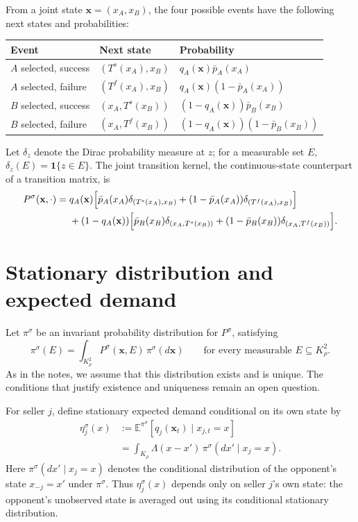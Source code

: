 \documentclass[11pt]{article}
\newcommand{\E}{\mathbb E}
\newcommand{\Ind}[1]{\mathbf 1\{#1\}}
\newcommand{\K}{K_\rho}
\newcommand{\xx}{\mathbf x}
\begin{document}
From a joint state $\xx=(x_A,x_B)$, the four possible events have the
following next states and probabilities:
\begin{center}
\renewcommand{\arraystretch}{1.3}
\begin{tabular}{lll}
\toprule
Event & Next state & Probability \\
\midrule
$A$ selected, success & $(T^s(x_A),x_B)$
  & $q_A(\xx)\bar p_A(x_A)$ \\
$A$ selected, failure & $(T^f(x_A),x_B)$
  & $q_A(\xx)(1-\bar p_A(x_A))$ \\
$B$ selected, success & $(x_A,T^s(x_B))$
  & $(1-q_A(\xx))\bar p_B(x_B)$ \\
$B$ selected, failure & $(x_A,T^f(x_B))$
  & $(1-q_A(\xx))(1-\bar p_B(x_B))$ \\
\bottomrule
\end{tabular}
\end{center}

Let $\delta_z$ denote the Dirac probability measure at $z$; for a
measurable set $E$, $\delta_z(E)=\Ind{z\in E}$. The joint transition
kernel, the continuous-state counterpart of a transition matrix, is
\begin{equation}\label{eq:joint-kernel}
\begin{aligned}
P^\sigma(\xx,\cdot)
={}&q_A(\xx)\Bigl[
  \bar p_A(x_A)\delta_{(T^s(x_A),x_B)}
 +(1-\bar p_A(x_A))\delta_{(T^f(x_A),x_B)}\Bigr]\\
&+(1-q_A(\xx))\Bigl[
  \bar p_B(x_B)\delta_{(x_A,T^s(x_B))}
 +(1-\bar p_B(x_B))\delta_{(x_A,T^f(x_B))}\Bigr].
\end{aligned}
\end{equation}

\section{Stationary distribution and expected demand}

Let $\pi^\sigma$ be an invariant probability distribution for
$P^\sigma$, satisfying
\begin{equation}\label{eq:stationary-distribution}
\pi^\sigma(E)=\int_{\K^2}P^\sigma(\xx,E)\,\pi^\sigma(d\xx)
\qquad\text{for every measurable }E\subseteq\K^2.
\end{equation}
As in the notes, we assume that this distribution exists and is unique.
The conditions that justify existence and uniqueness remain an open
question.

For seller $j$, define stationary expected demand conditional on its
own state by
\begin{equation}\label{eq:conditional-demand}
\begin{aligned}
\eta_j^\sigma(x)
&:=\E^{\pi^\sigma}\!\left[q_j(\xx_t)\mid x_{j,t}=x\right]\\
&=\int_{\K}\Lambda(x-x')\,
  \pi^\sigma(dx'\mid x_j=x).
\end{aligned}
\end{equation}
Here $\pi^\sigma(dx'\mid x_j=x)$ denotes the conditional distribution
of the opponent's state $x_{-j}=x'$ under $\pi^\sigma$.
Thus $\eta_j^\sigma(x)$ depends only on seller $j$'s own state: the
opponent's unobserved state is averaged out using its conditional
stationary distribution.
\end{document}

